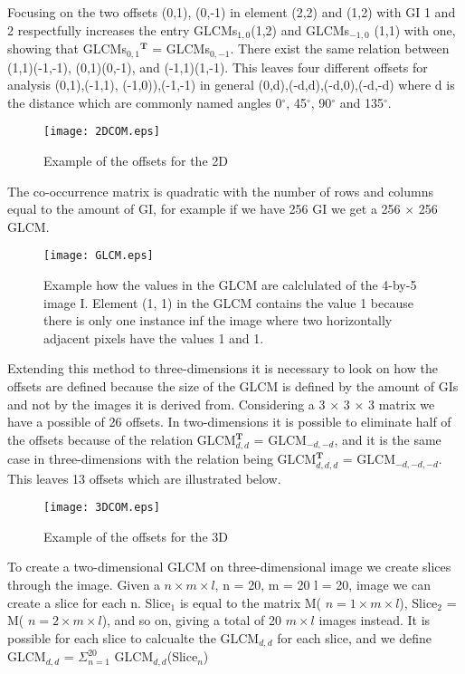Focusing on the two offsets {(0,1), (0,-1)} in element (2,2) and (1,2) with GI 1 and 2 respectfully increases the entry GLCMs$_{1,0}$(1,2) and GLCMs$_{-1,0}$ (1,1) with one, showing that GLCMs$_{0,1}$$^\textbf{T}$ = GLCMs$_{0,-1}$. There exist the same relation between (1,1)(-1,-1), (0,1)(0,-1), and (-1,1)(1,-1). This leaves four different offsets for analysis {(0,1),(-1,1), (-1,0)),(-1,-1)} in general {(0,d),(-d,d),(-d,0),(-d,-d)} where d is the distance which are commonly named angles 0$^\circ$, 45$^\circ$, 90$^\circ$ and 135$^\circ$.

\begin{figure}[H]
  \centering
  \texttt{[image: 2DCOM.eps]}
  \caption{Example of the offsets for the 2D}\label{2DCOM}
\end{figure}

The co-occurrence matrix is quadratic with the number of rows and columns equal to the amount of GI, for example if we have 256 GI we get a 256 $\times$ 256 GLCM.

\begin{figure}[H]
  \centering
  \texttt{[image: GLCM.eps]}
  \caption{Example how the values in the GLCM are calclulated of the 4-by-5 image I. Element (1, 1) in the GLCM contains the value 1 because there is only one instance inf the image where two horizontally adjacent pixels have the values 1 and 1.}\label{GLCM}
\end{figure}

Extending this method to three-dimensions it is necessary to look on how the offsets are defined because the size of the GLCM is defined by the amount of GIs and not by the images it is derived from. Considering a 3 $\times$ 3 $\times$ 3 matrix we have a possible of 26 offsets. In two-dimensions it is possible to eliminate half of the offsets because of the relation GLCM$_{d,d}^\textbf{T}$ = GLCM$_{-d,-d}$, and it is the same case in three-dimensions with the relation being GLCM$_{d,d,d}^\textbf{T}$ = GLCM$_{-d,-d,-d}$. This leaves 13 offsets which are illustrated below.\\

\begin{figure}[H]
  \centering
  \texttt{[image: 3DCOM.eps]}
  \caption{Example of the offsets for the 3D}\label{3DCOM}
\end{figure}



To create a two-dimensional GLCM on three-dimensional image we create slices through the image. Given a $n \times m \times l$, n = 20, m = 20 l = 20, image we can create a slice for each n. Slice$_1$ is equal to the matrix M( $n = 1 \times m \times l$), Slice$_2$ = M( $n = 2 \times m \times l$), and so on, giving a total of 20 $m \times l$ images instead. It is possible for each slice to calcualte the GLCM$_{d,d}$ for each slice, and we define GLCM$_{d,d}$ = $ \Sigma_{n=1}^20$ GLCM$_{d,d}$(Slice$_n$)


